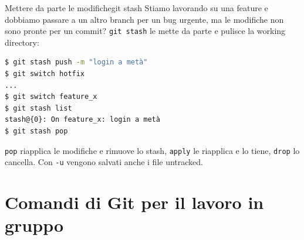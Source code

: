 \documentclass[aspectratio=169,handout,10pt]{beamer}
\begin{document}
\begin{frame}[fragile]{Mettere da parte le modifiche}{git stash}
    Stiamo lavorando su una feature e dobbiamo passare a un altro branch per un bug urgente, ma le modifiche non sono pronte per un commit? \lstinline{git stash} le mette da parte e pulisce la working directory:
    \begin{lstlisting}[language=bash]
$ git stash push -m "login a metà"
$ git switch hotfix
...
$ git switch feature_x
$ git stash list
stash@{0}: On feature_x: login a metà
$ git stash pop\end{lstlisting}
    \lstinline{pop} riapplica le modifiche e rimuove lo stash, \lstinline{apply} le riapplica e lo tiene, \lstinline{drop} lo cancella. Con \lstinline{-u} vengono salvati anche i file untracked.
\end{frame}

\section{Comandi di Git per il lavoro in gruppo}
\end{document}
